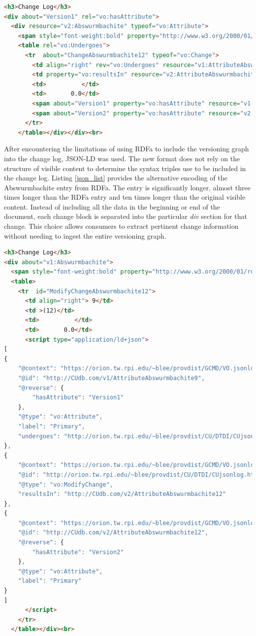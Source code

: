 \begin{lstlisting}[language=HTML, caption=Abswurmbachite RDFa, label=rdfa_list]
<h3>Change Log</h3>
<div about="Version1" rel="vo:hasAttribute">
  <div resource="v2:Abswurmbachite" typeof="vo:Attribute">
    <span style="font-weight:bold" property="http://www.w3.org/2000/01/rdf-schema#label">Abswurmbachite</span>
    <table rel="vo:Undergoes">
      <tr  about="ChangeAbswurmbachite12" typeof="vo:Change">
        <td align="right" rev="vo:Undergoes" resource="v1:AttributeAbswurmbachite12v1" typeof="vo:Attribute"> 9</td>
        <td property="vo:resultsIn" resource="v2:AttributeAbswurmbachite12v2" typeof="vo:Attribute">(12)</td>
        <td>          </td>
        <td>       0.0</td>
        <span about="Version1" property="vo:hasAttribute" resource="v1:AttributeAbswurmbachite12v1"></span>
        <span about="Version2" property="vo:hasAttribute" resource="v2:AttributeAbswurmbachite12v2"></span>
      </tr>
    </table></div></div><br>
\end{lstlisting}

After encountering the limitations of using RDFa to include the versioning graph into the change log, JSON-LD was used.
The new format does not rely on the structure of visible content to determine the syntax triples use to be included in the change log.
Listing \ref{json_list} provides the alternative encoding of the Abswurmbachite entry from RDFa.
The entry is significantly longer, almost three times longer than the RDFa entry and ten times longer than the original visible content.
Instead of including all the data in the beginning or end of the document, each change block is separated into the particular \textit{div} section for that change.
This choice allows consumers to extract pertinent change information without needing to ingest the entire versioning graph.

\begin{lstlisting}[language=HTML, caption=Abswurmbachite JSON-LD, label=json_list]
<h3>Change Log</h3>
<div about="v1:Abswurmbachite">
  <span style="font-weight:bold" property="http://www.w3.org/2000/01/rdf-schema#label">Abswurmbachite</span>
  <table>
    <tr  id="ModifyChangeAbswurmbachite12">
      <td align="right"> 9</td>
      <td >(12)</td>
      <td>          </td>
      <td>       0.0</td>
      <script type="application/ld+json">
[
{
	"@context": "https://orion.tw.rpi.edu/~blee/provdist/GCMD/VO.jsonld", 
	"@id": "http://CUdb.com/v1/AttributeAbswurmbachite9", 
	"@reverse": {
		"hasAttribute": "Version1"
	}, 
	"@type": "vo:Attribute", 
	"label": "Primary", 
	"undergoes": "http://orion.tw.rpi.edu/~blee/provdist/CU/DTDI/CUjsonlog.html#ModifyChangeAbswurmbachite12"
}, 
{
	"@context": "https://orion.tw.rpi.edu/~blee/provdist/GCMD/VO.jsonld", 
	"@id": "http://orion.tw.rpi.edu/~blee/provdist/CU/DTDI/CUjsonlog.html#ModifyChangeAbswurmbachite12", 
	"@type": "vo:ModifyChange", 
	"resultsIn": "http://CUdb.com/v2/AttributeAbswurmbachite12"
}, 
{
	"@context": "https://orion.tw.rpi.edu/~blee/provdist/GCMD/VO.jsonld", 
	"@id": "http://CUdb.com/v2/AttributeAbswurmbachite12", 
	"@reverse": {
		"hasAttribute": "Version2"
	}, 
	"@type": "vo:Attribute", 
	"label": "Primary"
}
]
      </script>
    </tr>
  </table></div><br>
\end{lstlisting}

